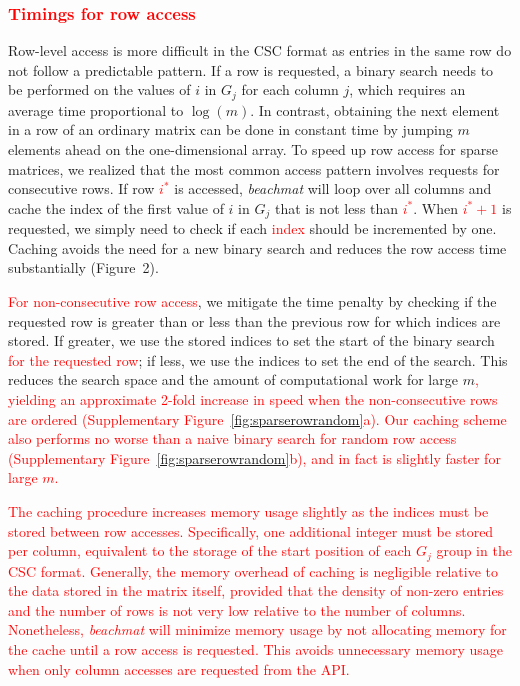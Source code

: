 \documentclass{article}
\newcommand{\beachmat}{\textit{beachmat}}
\newcommand{\revised}[1]{\textcolor{red}{#1}}
\begin{document}
\subsubsection{\revised{Timings for row access}}
Row-level access is more difficult in the CSC format as entries in the same row do not follow a predictable pattern.
If a row is requested, a binary search needs to be performed on the values of $i$ in $G_j$ for each column $j$, which requires an average time proportional to $\log(m)$.
In contrast, obtaining the next element in a row of an ordinary matrix can be done in constant time by jumping $m$ elements ahead on the one-dimensional array.
To speed up row access for sparse matrices, we realized that the most common access pattern involves requests for consecutive rows.
If row \revised{$i^*$} is accessed, \beachmat{} will loop over all columns and cache the index of the first value of $i$ in $G_j$ that is not less than \revised{$i^*$}.
When \revised{$i^*+1$} is requested, we simply need to check if each \revised{index} should be incremented by one.
Caching avoids the need for a new binary search and reduces the row access time substantially (Figure~2).


\revised{For non-consecutive row access}, we mitigate the time penalty by checking if the requested row is greater than or less than the previous row for which indices are stored.
If greater, we use the stored indices to set the start of the binary search \revised{for the requested row}; if less, we use the indices to set the end of the search. 
This reduces the search space and the amount of computational work for large $m$\revised{, yielding an approximate 2-fold increase in speed when the non-consecutive rows are ordered (Supplementary Figure~\ref{fig:sparserowrandom}a).
Our caching scheme also performs no worse than a naive binary search for random row access (Supplementary Figure~\ref{fig:sparserowrandom}b), and in fact is slightly faster for large $m$.}

\revised{The caching procedure increases memory usage slightly as the indices must be stored between row accesses.
Specifically, one additional integer must be stored per column, equivalent to the storage of the start position of each $G_j$ group in the CSC format.
Generally, the memory overhead of caching is negligible relative to the data stored in the matrix itself, provided that the density of non-zero entries and the number of rows is not very low relative to the number of columns.
Nonetheless, \beachmat{} will minimize memory usage by not allocating memory for the cache until a row access is requested.
This avoids unnecessary memory usage when only column accesses are requested from the API.}
\end{document}

